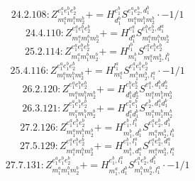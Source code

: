 \documentclass[letterpaper,10pt,fleqn,leqno,onecolumn]{article}
\begin{document}
\begin{equation} \;\;\;\;\;\;  24.2.108: Z^{e_{1}^{a}e_{1}^{b}e_{2}^{b}}_{m_{1}^{a}m_{1}^{b}m_{2}^{b}}+=H^{e_{1}^{b}}_{d_{1}^{b}}S^{e_{1}^{a}e_{2}^{b},d_{1}^{b}}_{m_{1}^{a}m_{1}^{b}m_{2}^{b}}\cdot -1/1 \end{equation}
\begin{equation} \;\;\;\;\;\;  24.4.110: Z^{e_{1}^{a}e_{1}^{b}e_{2}^{b}}_{m_{1}^{a}m_{1}^{b}m_{2}^{b}}+=H^{e_{1}^{a}}_{d_{1}^{a}}S^{e_{1}^{b}e_{2}^{b},d_{1}^{a}}_{m_{1}^{a}m_{1}^{b}m_{2}^{b}} \end{equation}
\begin{equation} \;\;\;\;\;\;  25.2.114: Z^{e_{1}^{a}e_{1}^{b}e_{2}^{b}}_{m_{1}^{a}m_{1}^{b}m_{2}^{b}}+=H^{l_{1}^{b}}_{m_{1}^{b}}S^{e_{1}^{a}e_{1}^{b}e_{2}^{b}}_{m_{1}^{a}m_{2}^{b},l_{1}^{b}} \end{equation}
\begin{equation} \;\;\;\;\;\;  25.4.116: Z^{e_{1}^{a}e_{1}^{b}e_{2}^{b}}_{m_{1}^{a}m_{1}^{b}m_{2}^{b}}+=H^{l_{1}^{a}}_{m_{1}^{a}}S^{e_{1}^{a}e_{1}^{b}e_{2}^{b}}_{m_{1}^{b}m_{2}^{b},l_{1}^{a}}\cdot -1/1 \end{equation}
\begin{equation} \;\;\;\;\;\;  26.2.120: Z^{e_{1}^{a}e_{1}^{b}e_{2}^{b}}_{m_{1}^{a}m_{1}^{b}m_{2}^{b}}+=H^{e_{1}^{b}e_{2}^{b}}_{d_{1}^{b}d_{2}^{b}}S^{e_{1}^{a},d_{1}^{b}d_{2}^{b}}_{m_{1}^{a}m_{1}^{b}m_{2}^{b}} \end{equation}
\begin{equation} \;\;\;\;\;\;  26.3.121: Z^{e_{1}^{a}e_{1}^{b}e_{2}^{b}}_{m_{1}^{a}m_{1}^{b}m_{2}^{b}}+=H^{e_{1}^{a}e_{1}^{b}}_{d_{1}^{a}d_{1}^{b}}S^{e_{2}^{b},d_{1}^{a}d_{1}^{b}}_{m_{1}^{a}m_{1}^{b}m_{2}^{b}} \end{equation}
\begin{equation} \;\;\;\;\;\;  27.2.126: Z^{e_{1}^{a}e_{1}^{b}e_{2}^{b}}_{m_{1}^{a}m_{1}^{b}m_{2}^{b}}+=H^{e_{1}^{b},l_{1}^{b}}_{m_{1}^{b},d_{1}^{b}}S^{e_{1}^{a}e_{2}^{b},d_{1}^{b}}_{m_{1}^{a}m_{2}^{b},l_{1}^{b}} \end{equation}
\begin{equation} \;\;\;\;\;\;  27.5.129: Z^{e_{1}^{a}e_{1}^{b}e_{2}^{b}}_{m_{1}^{a}m_{1}^{b}m_{2}^{b}}+=H^{e_{1}^{b},l_{1}^{a}}_{m_{1}^{b},d_{1}^{a}}S^{e_{1}^{a}e_{2}^{b},d_{1}^{a}}_{m_{1}^{a}m_{2}^{b},l_{1}^{a}} \end{equation}
\begin{equation} \;\;\;\;\;\;  27.7.131: Z^{e_{1}^{a}e_{1}^{b}e_{2}^{b}}_{m_{1}^{a}m_{1}^{b}m_{2}^{b}}+=H^{e_{1}^{b},l_{1}^{a}}_{m_{1}^{a},d_{1}^{b}}S^{e_{1}^{a}e_{2}^{b},d_{1}^{b}}_{m_{1}^{b}m_{2}^{b},l_{1}^{a}}\cdot -1/1 \end{equation}
\end{document}
